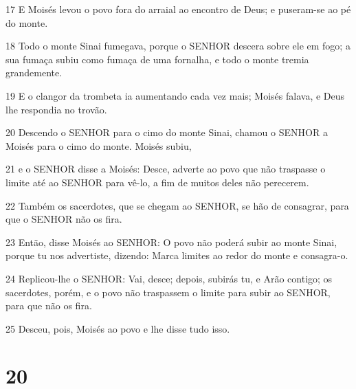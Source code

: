 \par 17 E Moisés levou o povo fora do arraial ao encontro de Deus; e puseram-se ao pé do monte.
\par 18 Todo o monte Sinai fumegava, porque o SENHOR descera sobre ele em fogo; a sua fumaça subiu como fumaça de uma fornalha, e todo o monte tremia grandemente.
\par 19 E o clangor da trombeta ia aumentando cada vez mais; Moisés falava, e Deus lhe respondia no trovão.
\par 20 Descendo o SENHOR para o cimo do monte Sinai, chamou o SENHOR a Moisés para o cimo do monte. Moisés subiu,
\par 21 e o SENHOR disse a Moisés: Desce, adverte ao povo que não traspasse o limite até ao SENHOR para vê-lo, a fim de muitos deles não perecerem.
\par 22 Também os sacerdotes, que se chegam ao SENHOR, se hão de consagrar, para que o SENHOR não os fira.
\par 23 Então, disse Moisés ao SENHOR: O povo não poderá subir ao monte Sinai, porque tu nos advertiste, dizendo: Marca limites ao redor do monte e consagra-o.
\par 24 Replicou-lhe o SENHOR: Vai, desce; depois, subirás tu, e Arão contigo; os sacerdotes, porém, e o povo não traspassem o limite para subir ao SENHOR, para que não os fira.
\par 25 Desceu, pois, Moisés ao povo e lhe disse tudo isso.

\chapter{20}

